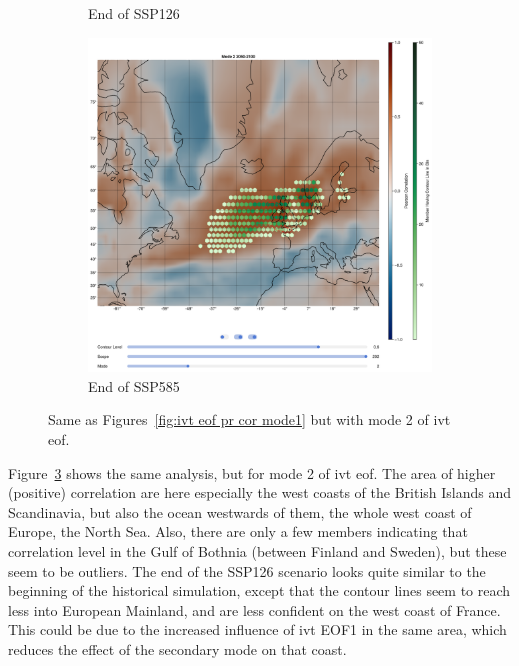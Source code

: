 \begin{figure}[!htb]
\begin{subfigure}[b]{0.32\textwidth}
    \caption{End of SSP126} 
    \label{fig:ivt eof pr cor ssp126 mode2}
  \end{subfigure}
  \begin{subfigure}[b]{0.32\textwidth}
    \includegraphics[width=\textwidth]{figures/ivt_pr_cor_mode2_ssp585_hexbin.png}
    \caption{End of SSP585}
    \label{fig:ivt eof pr cor ssp585 mode2}
  \end{subfigure}
  \caption{Same as Figures~\ref{fig:ivt eof pr cor mode1} but with mode 2 of \ac{ivt} \ac{eof}.}
  \label{fig:ivt eof pr cor mode2}
\end{figure}

Figure~\ref{fig:ivt eof pr cor mode2} shows the same analysis, but for mode 2 of \ac{ivt} \ac{eof}. 
The area of higher (positive) correlation are here especially the west coasts of the British Islands and Scandinavia, but also the ocean westwards of them, the whole west coast of Europe, the North Sea. 
Also, there are only a few members indicating that correlation level in the Gulf of Bothnia (between Finland and Sweden), but these seem to be outliers. 
The end of the SSP126 scenario looks quite similar to the beginning of the historical simulation, except that the contour lines seem to reach less into European Mainland, and are less confident on the west coast of France.  
This could be due to the increased influence of \ac{ivt} EOF1 in the same area, which reduces the effect of the secondary mode on that coast. 


